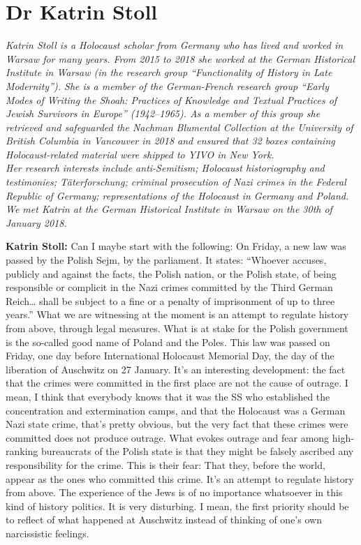 \section{Dr Katrin Stoll} 

\textit{Katrin Stoll is a Holocaust scholar from Germany who has lived and worked in Warsaw for many years. From 2015 to 2018 she worked at the German Historical Institute in Warsaw (in the research group "`Functionality of History in Late Modernity"'). She is a member of the German-French research group "`Early Modes of Writing the Shoah: Practices of Knowledge and Textual Practices of Jewish Survivors in Europe"' (1942–1965). As a member of this group she retrieved and safeguarded the Nachman Blumental Collection at the University of British Columbia in Vancouver in 2018 and ensured that 32 boxes containing Holocaust-related material were shipped to YIVO in New York. \\
Her research interests include anti-Semitism; Holocaust historiography and testimonies; Täterforschung; criminal prosecution of Nazi crimes in the Federal Republic of Germany; representations of the Holocaust in Germany and Poland. \\
We met Katrin at the German Historical Institute in Warsaw on the 30th of January 2018.}\par 
\vspace*{2em}
\textbf{Katrin Stoll:} Can I maybe start with the following: On Friday, a new law was passed by the Polish Sejm, by the parliament. It states: “Whoever accuses, publicly and against the facts, the Polish nation, or the Polish state, of being responsible or complicit in the Nazi crimes committed by the Third German Reich… shall be subject to a fine or a penalty of imprisonment of up to three years.” What we are witnessing at the moment is an attempt to regulate history from above, through legal measures.  What is at stake for the Polish government is the so-called good name of Poland and the Poles. This law was passed on Friday, one day before International Holocaust Memorial Day, the day of the liberation of Auschwitz on 27 January. It’s an interesting development: the fact that the crimes were committed in the first place are not the cause of outrage. I mean, I think that everybody knows that it was the SS who established the concentration and extermination camps, and that the Holocaust was a German Nazi state crime, that’s pretty obvious, but the very fact that these crimes were committed does not produce outrage. What evokes outrage and fear among high-ranking bureaucrats of the Polish state is that they might be falsely ascribed any responsibility for the crime. This is their fear: That they, before the world, appear as the ones who committed this crime. It’s an attempt to regulate history from above. The experience of the Jews is of no importance whatsoever in this kind of history politics. It is very disturbing. I mean, the first priority should be to reflect of what happened at Auschwitz instead of thinking of one’s own narcissistic feelings. 

